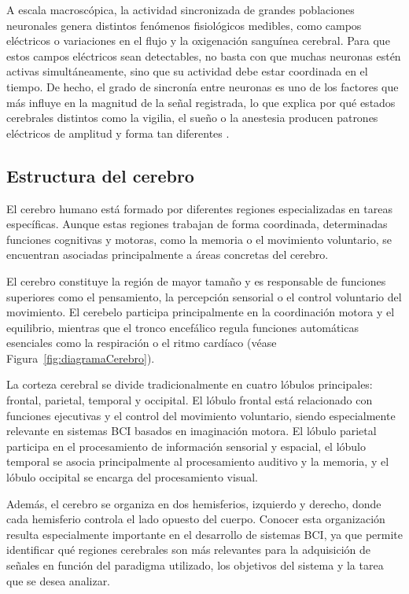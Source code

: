 A escala macroscópica, la actividad sincronizada de grandes poblaciones neuronales genera distintos fenómenos fisiológicos medibles, como campos eléctricos o variaciones en el flujo y la oxigenación sanguínea cerebral. Para que estos campos eléctricos sean detectables, no basta con que muchas neuronas estén activas simultáneamente, sino que su actividad debe estar coordinada en el tiempo. De hecho, el grado de sincronía entre neuronas es uno de los factores que más influye en la magnitud de la señal registrada, lo que explica por qué estados cerebrales distintos como la vigilia, el sueño o la anestesia producen patrones eléctricos de amplitud y forma tan diferentes \cite{buzsaki2012origin}.

\subsection{Estructura del cerebro}
\label{subsec:estructuraCerebro}

El cerebro humano está formado por diferentes regiones especializadas en tareas específicas. Aunque estas regiones trabajan de forma coordinada, determinadas funciones cognitivas y motoras, como la memoria o el movimiento voluntario, se encuentran asociadas principalmente a áreas concretas del cerebro.

El cerebro constituye la región de mayor tamaño y es responsable de funciones superiores como el pensamiento, la percepción sensorial o el control voluntario del movimiento. El cerebelo participa principalmente en la coordinación motora y el equilibrio, mientras que el tronco encefálico regula funciones automáticas esenciales como la respiración o el ritmo cardíaco (véase Figura~\ref{fig:diagramaCerebro}).

La corteza cerebral se divide tradicionalmente en cuatro lóbulos principales: frontal, parietal, temporal y occipital. El lóbulo frontal está relacionado con funciones ejecutivas y el control del movimiento voluntario, siendo especialmente relevante en sistemas BCI basados en imaginación motora. El lóbulo parietal participa en el procesamiento de información sensorial y espacial, el lóbulo temporal se asocia principalmente al procesamiento auditivo y la memoria, y el lóbulo occipital se encarga del procesamiento visual.

Además, el cerebro se organiza en dos hemisferios, izquierdo y derecho, donde cada hemisferio controla el lado opuesto del cuerpo. Conocer esta organización resulta especialmente importante en el desarrollo de sistemas BCI, ya que permite identificar qué regiones cerebrales son más relevantes para la adquisición de señales en función del paradigma utilizado, los objetivos del sistema y la tarea que se desea analizar.

